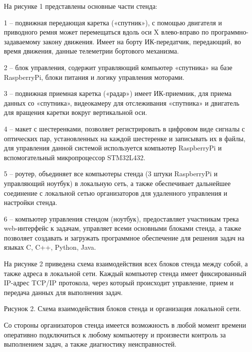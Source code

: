На рисунке 1 представлены основные части стенда:

1 – подвижная передающая каретка («спутник»), с помощью двигателя и приводного ремня может перемещаться вдоль оси X влево-вправо по программно-задаваемому закону движения. Имеет на борту ИК-передатчик, передающий, во время движения, данные телеметрии бортового механизма.

2 – блок управления, содержит управляющий компьютер «спутника» на базе RaspberryPi, блоки питания и логику управления моторами.

3 – подвижная приемная каретка («радар») имеет ИК-приемник, для приема данных со «спутника», видеокамеру для отслеживания «спутника» и двигатель для вращения каретки вокруг вертикальной оси.

4 – макет с шестеренками, позволяет регистрировать в цифровом виде сигналы с оптических пар, установленных на каждой шестеренке и записывать их в файлы, для управления данной системой используется компьютер RaspberryPi и вспомогательный микропроцессор STM32L432.

5 – роутер, объединяет все компьютеры стенда (3 штуки RaspberryPi и управляющий ноутбук) в локальную сеть, а также обеспечивает дальнейшее соединение с локальной сетью организаторов для удаленного управления и настройки стенда.

6 – компьютер управления стендом (ноутбук), предоставляет участникам трека web-интерфейс к задачам, управляет всеми основными блоками стенда, а также позволяет создавать и загружать программное обеспечение для решения задач на языках C, C++, Python, Java.

На рисунке 2 приведена схема взаимодействия всех блоков стенда между собой, а также адреса в локальной сети. Каждый компьютер стенда имеет фиксированный IP-адрес TCP/IP протокола, через который происходит управление, прием и передача данных для выполнения задач.


\begin{center}
    Рисунок 2. Схема взаимодействия блоков стенда и организация локальной сети.
\end{center}

Со стороны организаторов стенда имеется возможность в любой момент времени оперативно подключиться к любому компьютеру и произвести контроль за выполнением задач, а также диагностику неисправностей.